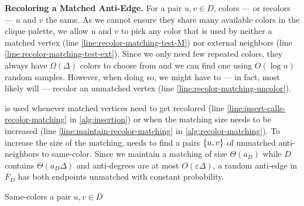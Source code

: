 \documentclass[a4paper,english,11pt]{amsart}
\renewcommand{\paragraph}[1]{\medskip\noindent\textbf{#1}}
\theoremstyle{definition}
\DeclarePairedDelimiter{\set}{\{}{\}}
\newcommand{\eps}{\varepsilon}
\begin{document}
\paragraph{Recoloring a Matched Anti-Edge.}
For a pair $u,v \in D$,  colors --- or recolors --- $u$ and $v$ the same. As we cannot ensure they share many available colors in the clique palette, we allow $u$ and $v$ to pick any color that is used by neither a matched vertex (line \ref{line:recolor-matching-test-M}) nor external neighbors (line \ref{line:recolor-matching-test-ext}). Since we only need few repeated colors, they always have $\Omega( \Delta )$ colors to choose from and we can find one using $O(\log n)$ random samples. However, when doing so, we might have to --- in fact, most likely will --- recolor an unmatched vertex (line \ref{line:recolor-matching-uncolor}).

\RecolorMatching is used whenever matched vertices need to get recolored (line \ref{line:insert-calls-recolor-matching} in \cref{alg:insertion}) or when the matching size needs to be increased (line \ref{line:maintain-recolor-matching} in \cref{alg:recolor-matching}). To increase the size of the matching, \AddAntiEdgeMatching needs to find a pairs $\set{u,v}$ of unmatched anti-neighbors to same-color. Since we maintain a matching of size $\Theta(a_D)$ while $D$ contains $\Theta(a_D\Delta)$ and anti-degrees are at most $O( \eps\Delta )$, a random anti-edge in $F_D$ has both endpoints unmatched with constant probability.

\begin{algorithm}
    \caption{Same-colors a pair $u,v\in D$}
    \label{alg:recolor-matching}

\end{algorithm}
\end{document}
